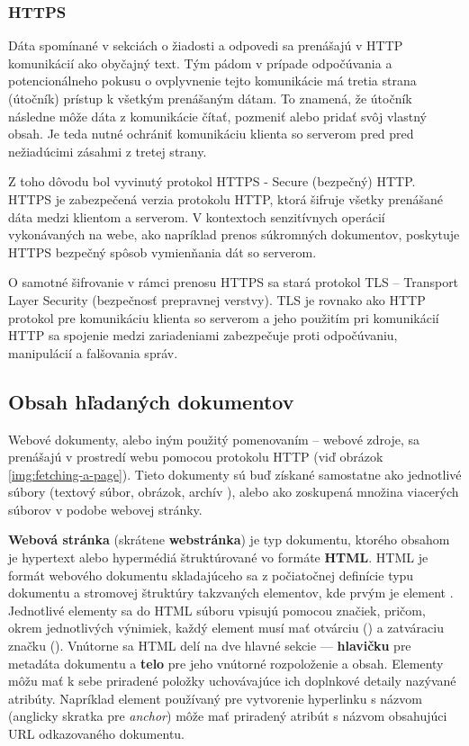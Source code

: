 \subsubsection{HTTPS}

Dáta spomínané v sekciách o žiadosti a odpovedi sa prenášajú v HTTP komunikácií ako obyčajný text. 
Tým pádom v prípade odpočúvania a potencionálneho pokusu o ovplyvnenie tejto komunikácie má tretia strana (útočník) prístup k všetkým prenášaným dátam. 
To znamená, že útočník následne môže dáta z komunikácie čítať, pozmeniť alebo pridať svôj vlastný obsah. 
Je teda nutné ochrániť komunikáciu klienta so serverom pred pred nežiadúcimi zásahmi z tretej strany.

Z toho dôvodu bol vyvinutý protokol HTTPS - Secure (bezpečný) HTTP.
HTTPS je zabezpečená verzia protokolu HTTP, ktorá šifruje všetky prenášané dáta medzi klientom a serverom.
V kontextoch senzitívnych operácií vykonávaných na webe, ako napríklad prenos súkromných dokumentov, poskytuje HTTPS bezpečný spôsob vymienňania dát so serverom.

O samotné šifrovanie v rámci prenosu HTTPS sa stará protokol TLS -- Transport Layer Security (bezpečnosť prepravnej verstvy).
TLS je rovnako ako HTTP protokol pre komunikáciu klienta so serverom a jeho použitím pri komunikácií HTTP sa spojenie medzi zariadeniami zabezpečuje proti odpočúvaniu, manipulácií a falšovania správ. 


\subsection{Obsah hľadaných dokumentov}
\label{obsah-hladanych-dokumentov}

Webové dokumenty, alebo iným použitý pomenovaním -- webové zdroje, sa prenášajú v prostredí webu pomocou protokolu HTTP (viď obrázok \ref{img:fetching-a-page}).
Tieto dokumenty sú buď získané samostatne ako jednotlivé súbory (textový súbor, obrázok, archív ), alebo ako zoskupená množina viacerých súborov v podobe webovej stránky.

\textbf{Webová stránka} (skrátene \textbf{webstránka}) je typ dokumentu, ktorého obsahom je hypertext alebo hypermédiá štruktúrované vo formáte \textbf{HTML}.
HTML je formát webového dokumentu skladajúceho sa z počiatočnej definície typu dokumentu a stromovej štruktúry takzvaných elementov, kde prvým je element . 
Jednotlivé elementy sa do HTML súboru vpisujú pomocou značiek, pričom, okrem jednotlivých výnimiek, 
každý element musí mať otvárciu () a zatváraciu značku ().
Vnútorne sa HTML delí na dve hlavné sekcie --- \textbf{hlavičku} pre metadáta dokumentu a \textbf{telo} pre jeho vnútorné rozpoloženie a obsah.
Elementy môžu mať k sebe priradené položky uchovávajúce ich doplnkové detaily nazývané atribúty. 
Napríklad element používaný pre vytvorenie hyperlinku s názvom  (anglicky skratka pre \textit{anchor}) 
môže mať priradený atribút s názvom  obsahujúci URL odkazovaného dokumentu.

